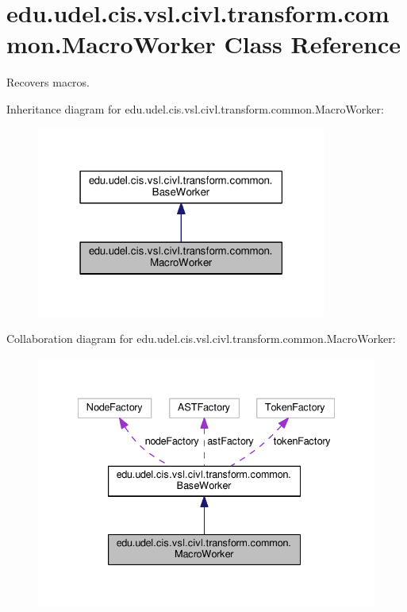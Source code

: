 \hypertarget{classedu_1_1udel_1_1cis_1_1vsl_1_1civl_1_1transform_1_1common_1_1MacroWorker}{}\section{edu.\+udel.\+cis.\+vsl.\+civl.\+transform.\+common.\+Macro\+Worker Class Reference}
\label{classedu_1_1udel_1_1cis_1_1vsl_1_1civl_1_1transform_1_1common_1_1MacroWorker}


Recovers macros.  




Inheritance diagram for edu.\+udel.\+cis.\+vsl.\+civl.\+transform.\+common.\+Macro\+Worker\+:
\nopagebreak
\begin{figure}[H]
\begin{center}
\leavevmode
\includegraphics[width=271pt]{classedu_1_1udel_1_1cis_1_1vsl_1_1civl_1_1transform_1_1common_1_1MacroWorker__inherit__graph}
\end{center}
\end{figure}


Collaboration diagram for edu.\+udel.\+cis.\+vsl.\+civl.\+transform.\+common.\+Macro\+Worker\+:
\nopagebreak
\begin{figure}[H]
\begin{center}
\leavevmode
\includegraphics[width=335pt]{classedu_1_1udel_1_1cis_1_1vsl_1_1civl_1_1transform_1_1common_1_1MacroWorker__coll__graph}
\end{center}
\end{figure}

